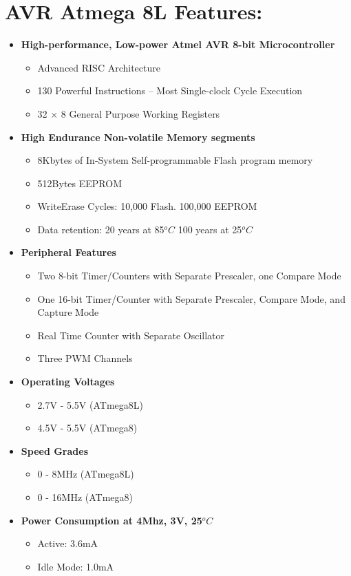 \documentclass[12pt, a4paper]{article}
\begin{document}
\section{AVR Atmega 8L Features:}
\begin{itemize}
\item \textbf{High-performance, Low-power Atmel AVR 8-bit Microcontroller}
\begin{itemize}
\item Advanced \ac{RISC} Architecture
\item 130 Powerful Instructions – Most Single-clock Cycle Execution
\item 32 × 8 General Purpose Working Registers
\end{itemize}
\item \textbf{High Endurance Non-volatile Memory segments}
\begin{itemize}
\item 8Kbytes of In-System Self-programmable Flash program memory
\item 512Bytes EEPROM
\item WriteErase Cycles: 10,000 Flash. 100,000 \ac{EEPROM}
\item Data retention: 20 years at 85$^oC$ 100 years at 25$^oC$
\end{itemize}
\item \textbf{Peripheral Features}
\begin{itemize}
\item Two 8-bit Timer/Counters with Separate Prescaler, one Compare Mode
\item One 16-bit Timer/Counter with Separate Prescaler, Compare Mode, and Capture Mode
\item Real Time Counter with Separate Oscillator
\item Three PWM Channels
\end{itemize}

\item \textbf{Operating Voltages}
\begin{itemize}
\item 2.7V - 5.5V (ATmega8L)
\item 4.5V - 5.5V (ATmega8)
\end{itemize}
\item \textbf{Speed Grades}
\begin{itemize}
\item 0 - 8MHz (ATmega8L)
\item 0 - 16MHz (ATmega8)
\end{itemize}
\item \textbf{Power Consumption at 4Mhz, 3V, 25$^oC$}
\begin{itemize}
\item Active: 3.6mA
\item Idle Mode: 1.0mA
\end{itemize}
\end{itemize}
\newpage
\end{document}
